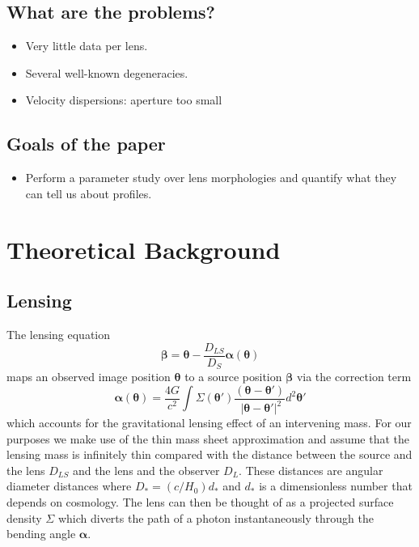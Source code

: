 \documentclass[onecolumn,galley]{mn2e}
\renewcommand{\vec}[1]{\ensuremath{\boldsymbol{#1}}}
\begin{document}
\subsection{What are the problems?} %
    \begin{itemize}
    \item Very little data per lens.
    \item Several well-known degeneracies.
    \item Velocity dispersions: aperture too small
    \end{itemize}

\subsection{Goals of the paper} %
    \begin{itemize}
    \item Perform a parameter study over lens morphologies and quantify what they can tell us about profiles.
    \end{itemize}


\section{Theoretical Background}

\subsection{Lensing}

The lensing equation
%
\begin{equation}
\vec\beta = \vec\theta - \frac{D_{LS}}{D_S}\vec\alpha(\vec\theta)
\label{lensing equation}
\end{equation}
%
maps an observed image position $\vec\theta$ to a source position $\vec\beta$
via the correction term 
%
\begin{equation}
\vec\alpha(\vec\theta) = \frac{4G}{c^2} \int \Sigma(\vec\theta')\frac{(\vec\theta - \vec\theta')}{\ |\vec\theta - \vec\theta'|^2}d^2\vec\theta'
\end{equation}
%
which accounts for the gravitational lensing effect of an intervening mass. For
our purposes we make use of the thin mass sheet approximation and assume that
the lensing mass is infinitely thin compared with the distance between the
source and the lens $D_{LS}$ and the lens and the observer $D_{L}$. These
distances are angular diameter distances where $D_* = (c/H_0)d_*$ and $d_*$ is
a dimensionless number that depends on cosmology.  The lens can then be thought
of as a projected surface density $\Sigma$ which diverts the path of a photon
instantaneously through the bending angle $\vec\alpha$.
\end{document}
